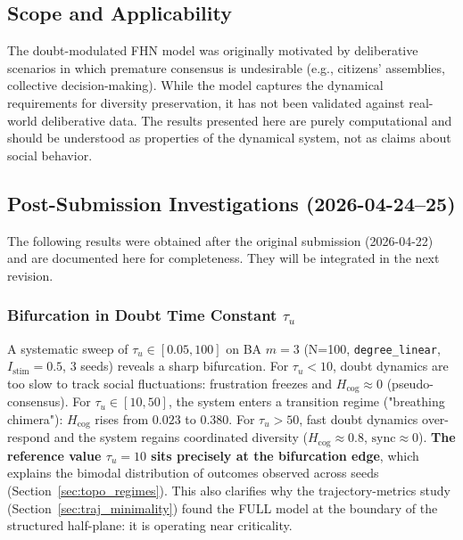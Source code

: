 \documentclass[11pt]{article}
\begin{document}
\subsection{Scope and Applicability}

The doubt-modulated FHN model was originally motivated by deliberative scenarios in which premature consensus is undesirable (e.g., citizens' assemblies, collective decision-making). While the model captures the dynamical requirements for diversity preservation, it has not been validated against real-world deliberative data. The results presented here are purely computational and should be understood as properties of the dynamical system, not as claims about social behavior.


\subsection{Post-Submission Investigations (2026-04-24--25)}
\label{sec:addendum}

The following results were obtained after the original submission (2026-04-22) and are documented here for completeness. They will be integrated in the next revision.

\subsubsection*{Bifurcation in Doubt Time Constant $\tau_u$}

A systematic sweep of $\tau_u \in [0.05, 100]$ on BA $m=3$ (N=100, \texttt{degree\_linear}, $I_{\mathrm{stim}}=0.5$, 3 seeds) reveals a sharp bifurcation. For $\tau_u < 10$, doubt dynamics are too slow to track social fluctuations: frustration freezes and $H_{\mathrm{cog}} \approx 0$ (pseudo-consensus). For $\tau_u \in [10, 50]$, the system enters a transition regime ("breathing chimera"): $H_{\mathrm{cog}}$ rises from $0.023$ to $0.380$. For $\tau_u > 50$, fast doubt dynamics over-respond and the system regains coordinated diversity ($H_{\mathrm{cog}} \approx 0.8$, $\mathrm{sync} \approx 0$). \textbf{The reference value $\tau_u = 10$ sits precisely at the bifurcation edge}, which explains the bimodal distribution of outcomes observed across seeds (Section~\ref{sec:topo_regimes}). This also clarifies why the trajectory-metrics study (Section~\ref{sec:traj_minimality}) found the FULL model at the boundary of the structured half-plane: it is operating near criticality.
\end{document}
